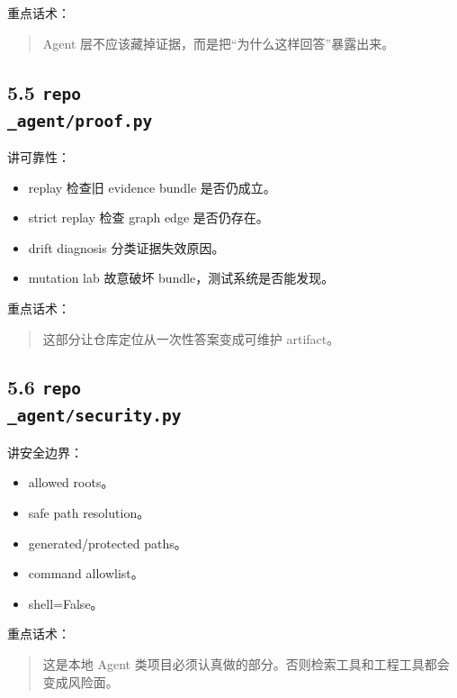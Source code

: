 \documentclass[UTF8,12pt,openany]{ctexbook}
\begin{document}
重点话术：\par

\begin{quote}
Agent 层不应该藏掉证据，而是把“为什么这样回答”暴露出来。
\end{quote}

\subsection{5.5 \texttt{repo\\_agent/proof.py}}

讲可靠性：\par

\begin{itemize}
\item replay 检查旧 evidence bundle 是否仍成立。
\item strict replay 检查 graph edge 是否仍存在。
\item drift diagnosis 分类证据失效原因。
\item mutation lab 故意破坏 bundle，测试系统是否能发现。
\end{itemize}

重点话术：\par

\begin{quote}
这部分让仓库定位从一次性答案变成可维护 artifact。
\end{quote}

\subsection{5.6 \texttt{repo\\_agent/security.py}}

讲安全边界：\par

\begin{itemize}
\item allowed roots。
\item safe path resolution。
\item generated/protected paths。
\item command allowlist。
\item shell=False。
\end{itemize}

重点话术：\par

\begin{quote}
这是本地 Agent 类项目必须认真做的部分。否则检索工具和工程工具都会变成风险面。
\end{quote}
\end{document}
